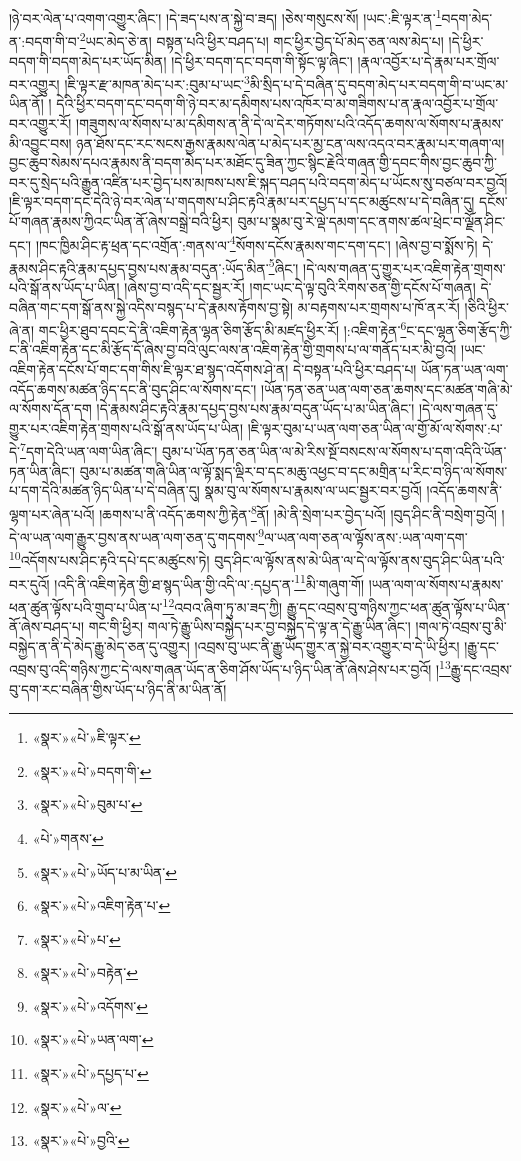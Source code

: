 །ཉེ་བར་ལེན་པ་འགག་འགྱུར་ཞིང་། །དེ་ཟད་པས་ན་སྐྱེ་བ་ཟད། །ཅེས་གསུངས་སོ། །ཡང་:ཇི་ལྟར་ན་\footnote{«སྣར་»«པེ་»ཇི་ལྟར་}བདག་མེད་ན་:བདག་གི་བ་\footnote{«སྣར་»«པེ་»བདག་གི་}ཡང་མེད་ཅེ་ན། བསྟན་པའི་ཕྱིར་བཤད་པ། གང་ཕྱིར་བྱེད་པོ་མེད་ཅན་ལས་མེད་པ། །དེ་ཕྱིར་བདག་གི་བདག་མེད་པར་ཡོད་མིན། །དེ་ཕྱིར་བདག་དང་བདག་གི་སྟོང་ལྟ་ཞིང་། །རྣལ་འབྱོར་པ་དེ་རྣམ་པར་གྲོལ་བར་འགྱུར། །ཇི་ལྟར་རྫ་མཁན་མེད་པར་:བུམ་པ་ཡང་\footnote{«སྣར་»«པེ་»བུམ་པ་}མི་སྲིད་པ་དེ་བཞིན་དུ་བདག་མེད་པར་བདག་གི་བ་ཡང་མ་ཡིན་ནོ། །
དེའི་ཕྱིར་བདག་དང་བདག་གི་ཉེ་བར་མ་དམིགས་པས་འཁོར་བ་མ་གཟིགས་པ་ན་རྣལ་འབྱོར་པ་གྲོལ་བར་འགྱུར་རོ། །གཟུགས་ལ་སོགས་པ་མ་དམིགས་ན་ནི་དེ་ལ་དེར་གཏོགས་པའི་འདོད་ཆགས་ལ་སོགས་པ་རྣམས་མི་འབྱུང་བས། ཉན་ཐོས་དང་རང་སངས་རྒྱས་རྣམས་ལེན་པ་མེད་པར་མྱ་ངན་ལས་འདའ་བར་རྣམ་པར་གཞག་ལ། བྱང་ཆུབ་སེམས་དཔའ་རྣམས་ནི་བདག་མེད་པར་མཐོང་དུ་ཟིན་ཀྱང་སྙིང་རྗེའི་གཞན་གྱི་དབང་གིས་བྱང་ཆུབ་ཀྱི་བར་དུ་སྲེད་པའི་རྒྱུན་འཛིན་པར་བྱེད་པས་མཁས་པས་ཇི་སྐད་བཤད་པའི་བདག་མེད་པ་ཡོངས་སུ་བཙལ་བར་བྱའོ། །ཇི་ལྟར་བདག་དང་དེའི་ཉེ་བར་ལེན་པ་གདགས་པ་ཤིང་རྟའི་རྣམ་པར་དཔྱད་པ་དང་མཚུངས་པ་དེ་བཞིན་དུ། དངོས་པོ་གཞན་རྣམས་ཀྱིའང་ཡིན་ནོ་ཞེས་བསྒྲེ་བའི་ཕྱིར། བུམ་པ་སྣམ་བུ་རེ་ལྡེ་དམག་དང་ནགས་ཚལ་ཕྲེང་བ་ལྗོན་ཤིང་དང་། །ཁང་ཁྱིམ་ཤིང་རྟ་ཕྲན་དང་འགྲོན་:གནས་ལ་\footnote{«པེ་»གནས་}སོགས་དངོས་རྣམས་གང་དག་དང་། །ཞེས་བྱ་བ་སྨོས་ཏེ། དེ་རྣམས་ཤིང་རྟའི་རྣམ་དཔྱད་བྱས་པས་རྣམ་བདུན་:ཡོད་མིན་\footnote{«སྣར་»«པེ་»ཡོད་པ་མ་ཡིན་}ཞིང་། །དེ་ལས་གཞན་དུ་གྱུར་པར་འཇིག་རྟེན་གྲགས་པའི་སྒོ་ནས་ཡོད་པ་ཡིན། །ཞེས་བྱ་བ་འདི་དང་སྦྱར་རོ། །གང་ཡང་དེ་ལྟ་བུའི་རིགས་ཅན་གྱི་དངོས་པོ་གཞན། དེ་བཞིན་གང་དག་སྒོ་ནས་སྐྱེ་འདིས་བསྙད་པ་དེ་རྣམས་རྟོགས་བྱ་སྟེ། མ་བརྟགས་པར་གྲགས་པ་ཁོ་ནར་རོ། །ཅིའི་ཕྱིར་ཞེ་ན། གང་ཕྱིར་ཐུབ་དབང་དེ་ནི་འཇིག་རྟེན་ལྷན་ཅིག་རྩོད་མི་མཛད་ཕྱིར་རོ། །:འཇིག་རྟེན་\footnote{«སྣར་»«པེ་»འཇིག་རྟེན་པ་}ང་དང་ལྷན་ཅིག་རྩོད་ཀྱི་ང་ནི་འཇིག་རྟེན་དང་མི་རྩོད་དོ་ཞེས་བྱ་བའི་ལུང་ལས་ན་འཇིག་རྟེན་གྱི་གྲགས་པ་ལ་གནོད་པར་མི་བྱའོ། །ཡང་འཇིག་རྟེན་དངོས་པོ་གང་དག་གིས་ཇི་ལྟར་ཐ་སྙད་འདོགས་ཤེ་ན། དེ་བསྟན་པའི་ཕྱིར་བཤད་པ། ཡོན་ཏན་ཡན་ལག་འདོད་ཆགས་མཚན་ཉིད་དང་ནི་བུད་ཤིང་ལ་སོགས་དང་། །ཡོན་ཏན་ཅན་ཡན་ལག་ཅན་ཆགས་དང་མཚན་གཞི་མེ་ལ་སོགས་དོན་དག །དེ་རྣམས་ཤིང་རྟའི་རྣམ་དཔྱད་བྱས་པས་རྣམ་བདུན་ཡོད་པ་མ་ཡིན་ཞིང་། །དེ་ལས་གཞན་དུ་གྱུར་པར་འཇིག་རྟེན་གྲགས་པའི་སྒོ་ནས་ཡོད་པ་ཡིན། །ཇི་ལྟར་བུམ་པ་ཡན་ལག་ཅན་ཡིན་ལ་གྱོ་མོ་ལ་སོགས་:པ་དེ་\footnote{«སྣར་»«པེ་»པ་}དག་དེའི་ཡན་ལག་ཡིན་ཞིང་། བུམ་པ་ཡོན་ཏན་ཅན་ཡིན་ལ་མེ་རིས་སྔོ་བསངས་ལ་སོགས་པ་དག་འདིའི་ཡོན་ཏན་ཡིན་ཞིང་། བུམ་པ་མཚན་གཞི་ཡིན་ལ་ལྟོ་སྨད་ལྡིར་བ་དང་མཆུ་འཕྱང་བ་དང་མགྲིན་པ་རིང་བ་ཉིད་ལ་སོགས་པ་དག་དེའི་མཚན་ཉིད་ཡིན་པ་དེ་བཞིན་དུ། སྣམ་བུ་ལ་སོགས་པ་རྣམས་ལ་ཡང་སྦྱར་བར་བྱའོ། །འདོད་ཆགས་ནི་ལྷག་པར་ཞེན་པའོ། །ཆགས་པ་ནི་འདོད་ཆགས་ཀྱི་རྟེན་\footnote{«སྣར་»«པེ་»བརྟེན་}ནོ། །མེ་ནི་སྲེག་པར་བྱེད་པའོ། །བུད་ཤིང་ནི་བསྲེག་བྱའོ། །དེ་ལ་ཡན་ལག་རྒྱུར་བྱས་ནས་ཡན་ལག་ཅན་དུ་གདགས་\footnote{«སྣར་»«པེ་»འདོགས་}ལ་ཡན་ལག་ཅན་ལ་ལྟོས་ནས་:ཡན་ལག་དག་\footnote{«སྣར་»«པེ་»ཡན་ལག་}འདོགས་པས་ཤིང་རྟའི་དཔེ་དང་མཚུངས་ཏེ། བུད་ཤིང་ལ་ལྟོས་ནས་མེ་ཡིན་ལ་དེ་ལ་ལྟོས་ནས་བུད་ཤིང་ཡིན་པའི་བར་དུའོ། །འདི་ནི་འཇིག་རྟེན་གྱི་ཐ་སྙད་ཡིན་གྱི་འདི་ལ་:དཔྱད་ན་\footnote{«སྣར་»«པེ་»དཔྱད་པ་}མི་གཞུག་གོ། །ཡན་ལག་ལ་སོགས་པ་རྣམས་ཕན་ཚུན་ལྟོས་པའི་གྲུབ་པ་ཡིན་པ་\footnote{«སྣར་»«པེ་»ལ་}འབའ་ཞིག་ཏུ་མ་ཟད་ཀྱི། རྒྱུ་དང་འབྲས་བུ་གཉིས་ཀྱང་ཕན་ཚུན་ལྟོས་པ་ཡིན་ནོ་ཞེས་བཤད་པ། གང་གི་ཕྱིར། གལ་ཏེ་རྒྱུ་ཡིས་བསྐྱེད་པར་བྱ་བསྐྱེད་དེ་ལྟ་ན་དེ་རྒྱུ་ཡིན་ཞིང་། །གལ་ཏེ་འབྲས་བུ་མི་བསྐྱེད་ན་ནི་དེ་མེད་རྒྱུ་མེད་ཅན་དུ་འགྱུར། །འབྲས་བུ་ཡང་ནི་རྒྱུ་ཡོད་གྱུར་ན་སྐྱེ་བར་འགྱུར་བ་དེ་ཡི་ཕྱིར། །རྒྱུ་དང་འབྲས་བུ་འདི་གཉིས་ཀྱང་དེ་ལས་གཞན་ཡོད་ན་ཅིག་ཤོས་ཡོད་པ་ཉིད་ཡིན་ནོ་ཞེས་ཤེས་པར་བྱའོ། །\footnote{«སྣར་»«པེ་»བྱའི་}རྒྱུ་དང་འབྲས་བུ་དག་རང་བཞིན་གྱིས་ཡོད་པ་ཉིད་ནི་མ་ཡིན་ནོ། 